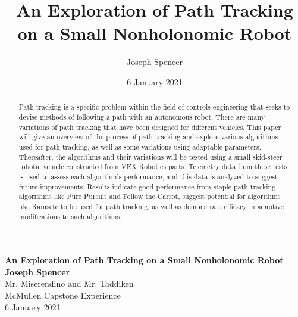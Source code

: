 \documentclass[mla8alt]{mla}
\title{An Exploration of Path Tracking on a Small Nonholonomic Robot}
\author{Joseph Spencer}
\date{6 January 2021}
\begin{document}
\begin{titlepage}
\begin{center}
\textbf{An Exploration of Path Tracking on a Small Nonholonomic Robot} \\
\vspace*{0.5cm}
\textbf{Joseph Spencer}\\
\vspace*{1cm}
\noindent
\hspace{-5cm}
Mr. Miserendino and Mr. Taddiken \\ McMullen Capstone Experience \\ 6 January 2021
\end{center}
\end{titlepage}

\newpage

\tableofcontents

\newpage

\begin{abstract}

Path tracking is a specific problem within the field of controls engineering that seeks to devise methods of following a path with an autonomous robot. There are many variations of path tracking that have been designed for different vehicles. This paper will give an overview of the process of path tracking and explore various algorithms used for path tracking, as well as some variations using adaptable parameters. Thereafter, the algorithms and their variations will be tested using a small skid-steer robotic vehicle constructed from VEX Robotics parts. Telemetry data from these tests is used to assess each algorithm's performance, and this data is analyzed to suggest future improvements. Results indicate good performance from staple path tracking algorithms like Pure Pursuit and Follow the Carrot, suggest potential for algorithms like Ramsete to be used for path tracking, as well as demonstrate efficacy in adaptive modifications to such algorithms.

\end{abstract}
\end{document}
